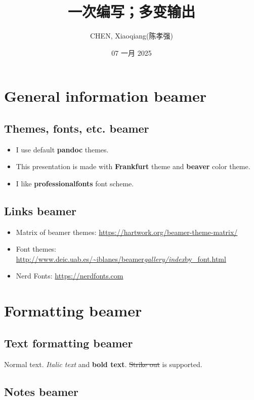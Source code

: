 \documentclass[
  11pt,
  ignorenonframetext,
]{article}
\title{一次编写；多变输出}
\author{CHEN, Xiaoqiang(陈孝强)}
\date{07 一月 2025}
\institute{粑粑柑革命共同体}
\providecommand{\tightlist}{%
  \setlength{\itemsep}{0pt}\setlength{\parskip}{0pt}}
\begin{document}
\frame{\titlepage}

\section{General information beamer}\label{general-information-beamer}

\subsection{Themes, fonts, etc. beamer}\label{themes-fonts-etc.-beamer}

\begin{itemize}
\tightlist
\item
  I use default \textbf{pandoc} themes.
\item
  This presentation is made with \textbf{Frankfurt} theme and
  \textbf{beaver} color theme.
\item
  I like \textbf{professionalfonts} font scheme.
\end{itemize}

\subsection{Links beamer}\label{links-beamer}

\begin{itemize}
\tightlist
\item
  Matrix of beamer themes:
  \url{https://hartwork.org/beamer-theme-matrix/}
\item
  Font themes:
  \href{http://www.deic.uab.es/~iblanes/beamer_gallery/index_by_font.html}{http://www.deic.uab.es/\textasciitilde iblanes/beamer\emph{gallery/index}by\_font.html}
\item
  Nerd Fonts: \url{https://nerdfonts.com}
\end{itemize}

\section{Formatting beamer}\label{formatting-beamer}

\subsection{Text formatting beamer}\label{text-formatting-beamer}

Normal text. \emph{Italic text} and \textbf{bold text}. \st{Strike out}
is supported.

\subsection{Notes beamer}\label{notes-beamer}
\end{document}
